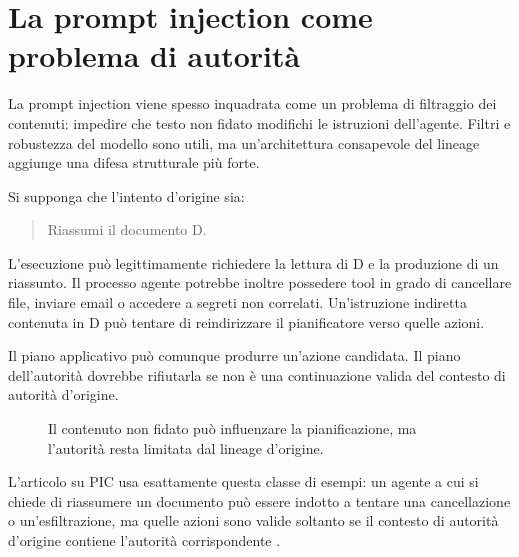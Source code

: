 \documentclass[10pt,oneside,openany]{book}
\begin{document}
\chapter{La prompt injection come problema di autorità}

La prompt injection viene spesso inquadrata come un problema di filtraggio dei contenuti: impedire che testo non fidato modifichi le istruzioni dell'agente. Filtri e robustezza del modello sono utili, ma un'architettura consapevole del lineage aggiunge una difesa strutturale più forte.

Si supponga che l'intento d'origine sia:

\begin{quote}
Riassumi il documento D.
\end{quote}

L'esecuzione può legittimamente richiedere la lettura di D e la produzione di un riassunto. Il processo agente potrebbe inoltre possedere tool in grado di cancellare file, inviare email o accedere a segreti non correlati. Un'istruzione indiretta contenuta in D può tentare di reindirizzare il pianificatore verso quelle azioni.

Il piano applicativo può comunque produrre un'azione candidata. Il piano dell'autorità dovrebbe rifiutarla se non è una continuazione valida del contesto di autorità d'origine.

\begin{figure}[ht]
\centering
{}
\caption{Il contenuto non fidato può influenzare la pianificazione, ma l'autorità resta limitata dal lineage d'origine.}
\end{figure}

L'articolo su PIC usa esattamente questa classe di esempi: un agente a cui si chiede di riassumere un documento può essere indotto a tentare una cancellazione o un'esfiltrazione, ma quelle azioni sono valide soltanto se il contesto di autorità d'origine contiene l'autorità corrispondente \cite{gallo2026pic}.
\end{document}
